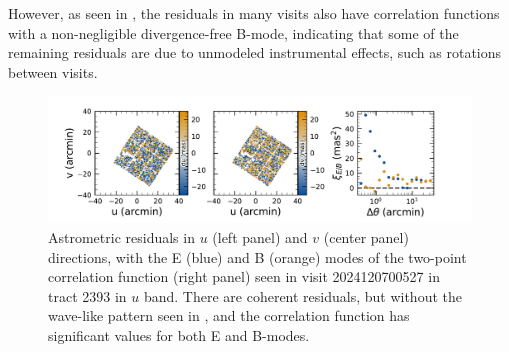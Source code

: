 However, as seen in , the residuals in many visits also have correlation functions with a non-negligible divergence-free B-mode,
indicating that some of the remaining residuals are due to unmodeled instrumental effects, such as rotations between visits.
\begin{figure}[htb!]
\includegraphics[width=\linewidth]{Astrometry_2024120700527}
\caption{Astrometric residuals in $u$ (left panel) and $v$ (center panel) directions, with the E (blue)  and B (orange) 
modes of the two-point correlation function (right panel) seen in visit 2024120700527 in tract 2393 in $u$ band.
There are coherent residuals, but without the wave-like pattern seen in , and the correlation function has significant values for both E and B-modes.}
\label{fig:Astrometry_EBmode}
\end{figure}

